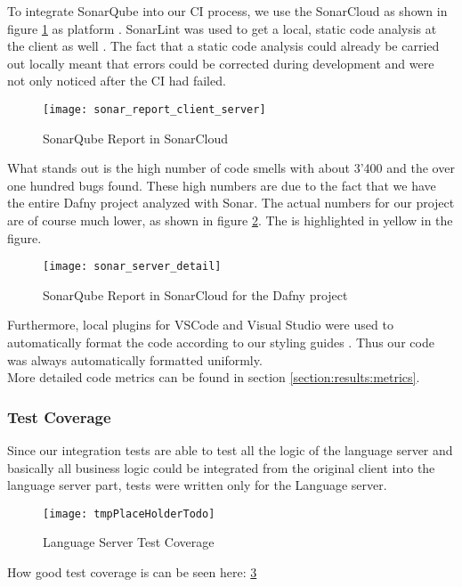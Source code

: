 To integrate SonarQube into our CI process, we use the SonarCloud as shown in figure \ref{fig:sonarcloud_report}
as platform \cite{sonarcloud}.
SonarLint was used to get a local, static code analysis at the client as well \cite{sonar-lint}.
The fact that a static code analysis could already be carried out locally meant that errors
could be corrected during development and were not only noticed after the CI had failed.

\begin{figure}[H]
    \centering
    \texttt{[image: sonar\_report\_client\_server]}
    \caption{SonarQube Report in SonarCloud}
    \label{fig:sonarcloud_report}
\end{figure}


What stands out is the high number of code smells with about 3'400
and the over one hundred bugs found.
These high numbers are due to the fact that we have the entire Dafny project analyzed with Sonar.
The actual numbers for our project are of course much lower,
as shown in figure \ref{fig:sonar_server_detail}.
The  is highlighted in yellow in the figure. 

\begin{figure}[H]
    \centering
    \texttt{[image: sonar\_server\_detail]}
    \caption{SonarQube Report in SonarCloud for the Dafny project}
    \label{fig:sonar_server_detail}
\end{figure}

Furthermore, local plugins for VSCode and Visual Studio were used to automatically
format the code according to our styling guides \cite{dev}.
Thus our code was always automatically formatted uniformly. \\

More detailed code metrics can be found in section \ref{section:results:metrics}.

\subsubsection{Test Coverage}
Since our integration tests are able to test all the logic of the language server
and basically all business logic could be integrated from the original client into the language server part,
tests were written only for the Language server.

\begin{figure}[H]
    \centering
    \texttt{[image: tmpPlaceHolderTodo]}
    \caption{Language Server Test Coverage}
    \label{fig:test_coverage}
\end{figure}

How good test coverage is can be seen here: \ref{fig:test_coverage}
